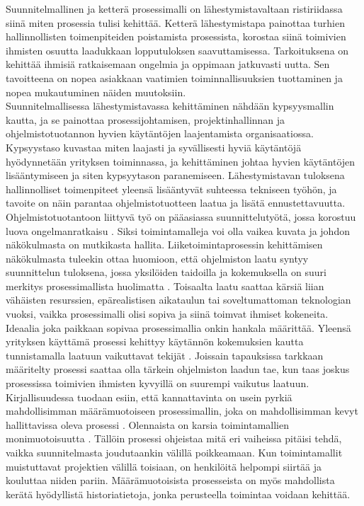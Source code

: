 \documentclass[finnish,12pt,a4paper,pdftex]{article}
\begin{document}
Suunnitelmallinen ja ketterä prosessimalli on lähestymistavaltaan ristiriidassa siinä miten prosessia tulisi kehittää. Ketterä lähestymistapa painottaa turhien hallinnollisten toimenpiteiden poistamista prosessista, korostaa siinä toimivien ihmisten osuutta laadukkaan lopputuloksen saavuttamisessa. Tarkoituksena on kehittää ihmisiä ratkaisemaan ongelmia ja oppimaan jatkuvasti uutta. Sen tavoitteena on nopea asiakkaan vaatimien toiminnallisuuksien tuottaminen ja nopea mukautuminen näiden muutoksiin.\citep{sommerville}\\

\noindent Suunnitelmallisessa lähestymistavassa kehittäminen nähdään kypsyysmallin kautta, ja se painottaa prosessijohtamisen, projektinhallinnan ja ohjelmistotuotannon hyvien käytäntöjen laajentamista organisaatiossa. Kypsyystaso kuvastaa miten laajasti ja syvällisesti hyviä käytäntöjä hyödynnetään yrityksen toiminnassa, ja kehittäminen johtaa hyvien käytäntöjen lisääntymiseen ja siten kypsyytason paranemiseen. Lähestymistavan tuloksena hallinnolliset toimenpiteet yleensä lisääntyvät suhteessa tekniseen työhön, ja tavoite on näin parantaa ohjelmistotuotteen laatua ja lisätä ennustettavuutta. \citep{sommerville}\\

Ohjelmistotuotantoon liittyvä työ on pääasiassa suunnittelutyötä, jossa korostuu luova ongelmanratkaisu \citep{kallio}. Siksi toimintamalleja voi olla vaikea kuvata ja johdon näkökulmasta on mutkikasta hallita. Liiketoimintaprosessin kehittämisen näkökulmasta tuleekin ottaa huomioon, että ohjelmiston laatu syntyy suunnittelun tuloksena, jossa yksilöiden taidoilla ja kokemuksella on suuri merkitys prosessimallista huolimatta \citep{ohjelmistotuotanto}. Toisaalta laatu saattaa kärsiä liian vähäisten resurssien, epärealistisen aikataulun tai soveltumattoman teknologian vuoksi, vaikka prosessimalli olisi sopiva ja siinä toimvat ihmiset kokeneita.\\

\noindent Ideaalia joka paikkaan sopivaa prosessimallia onkin hankala määrittää. Yleensä yrityksen käyttämä prosessi kehittyy käytännön kokemuksien kautta tunnistamalla laatuun vaikuttavat tekijät \citep{okaytannot, sommerville}. Joissain tapauksissa tarkkaan määritelty prosessi saattaa olla tärkein ohjelmiston laadun tae, kun taas joskus prosessissa toimivien ihmisten kyvyillä on suurempi vaikutus laatuun. \\

\noindent Kirjallisuudessa tuodaan esiin, että kannattavinta on usein pyrkiä mahdollisimman määrämuotoiseen prosessimallin, joka on mahdollisimman kevyt hallittavissa oleva prosessi \citep{okaytannot}. Olennaista on karsia toimintamallien monimuotoisuutta \citep{ohjelmistotuotanto, sommerville}. Tällöin prosessi ohjeistaa mitä eri vaiheissa pitäisi tehdä, vaikka suunnitelmasta joudutaankin välillä poikkeamaan. Kun toimintamallit muistuttavat projektien välillä toisiaan, on henkilöitä helpompi siirtää ja kouluttaa niiden pariin. Määrämuotoisista prosesseista on myös mahdollista kerätä hyödyllistä historiatietoja, jonka perusteella toimintaa voidaan kehittää.\\
\end{document}
